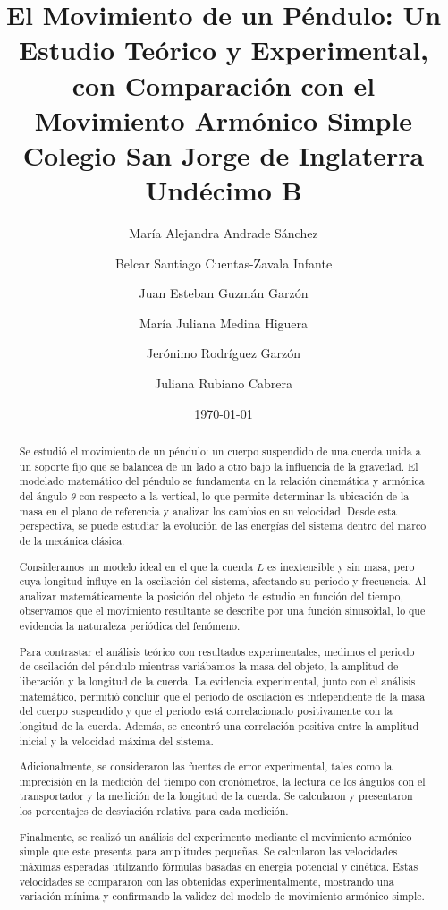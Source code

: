\documentclass[letterpaper]{report}
\title{
  El Movimiento de un Péndulo: Un Estudio Teórico y Experimental, con
  Comparación con el Movimiento Armónico Simple \\
  {\large Colegio San Jorge de Inglaterra \\
  Undécimo B}
}
\author{
  María Alejandra Andrade Sánchez \and
  Belcar Santiago Cuentas-Zavala Infante \and
  Juan Esteban Guzmán Garzón \and
  María Juliana Medina Higuera \and
  Jerónimo Rodríguez Garzón \and
  Juliana Rubiano Cabrera
}
\date{\today}
\numberwithin{table}{section}
\begin{document}
\maketitle

\tableofcontents

\begin{abstract}
  Se estudió el movimiento de un péndulo: un cuerpo suspendido de una
  cuerda unida a un soporte fijo que se balancea de un lado a otro
  bajo la influencia de la gravedad. El modelado matemático del
  péndulo se fundamenta en la relación cinemática y armónica del
  ángulo $\theta$ con respecto a la vertical, lo que permite determinar la
  ubicación de la masa en el plano de referencia y analizar los
  cambios en su velocidad. Desde esta perspectiva, se puede estudiar
  la evolución de las energías del sistema dentro del marco de la
  mecánica clásica.

  Consideramos un modelo ideal en el que la cuerda $L$ es inextensible
  y sin masa, pero cuya longitud influye en la oscilación del
  sistema, afectando su periodo y frecuencia. Al analizar
  matemáticamente la posición del objeto de estudio en función del
  tiempo, observamos que el movimiento resultante se
  describe por una función sinusoidal, lo que evidencia la naturaleza
  periódica del fenómeno.

  Para contrastar el análisis teórico con resultados experimentales,
  medimos el periodo de oscilación del péndulo mientras variábamos la
  masa del objeto, la amplitud de liberación y la longitud de la
  cuerda. La evidencia experimental, junto con el análisis
  matemático, permitió concluir que el periodo de oscilación es
  independiente de la masa del cuerpo suspendido y que el periodo
  está correlacionado positivamente con la longitud de la cuerda.
  Además, se encontró una correlación positiva entre la amplitud
  inicial y la velocidad máxima del sistema.

  Adicionalmente, se consideraron las fuentes de error experimental,
  tales como la imprecisión en la medición del tiempo con
  cronómetros, la lectura de los ángulos con el transportador y la
  medición de la longitud de la cuerda. Se calcularon y presentaron
  los porcentajes de desviación relativa para cada medición.

  Finalmente, se realizó un análisis del experimento mediante el
  movimiento armónico simple que este presenta para amplitudes
  pequeñas. Se calcularon las velocidades máximas esperadas
  utilizando fórmulas basadas en energía potencial y cinética. Estas
  velocidades se compararon con las obtenidas experimentalmente,
  mostrando una variación mínima y confirmando la validez del modelo
  de movimiento armónico simple.


\end{abstract}
\end{document}
